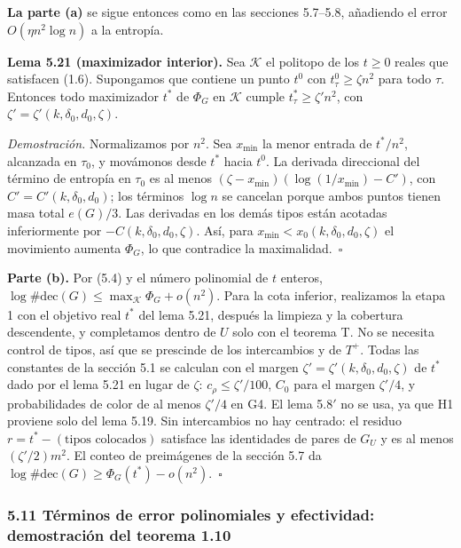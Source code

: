 \documentclass[spanish,11pt,a4paper]{article}
\begin{document}
\textbf{La parte (a)} se sigue entonces como en las secciones 5.7--5.8, añadiendo el error \(O(\eta n^2\log n)\) a la entropía.

\textbf{Lema 5.21 (maximizador interior).} Sea \(\mathcal K\) el politopo de los \(t\ge0\) reales que satisfacen (1.6). Supongamos que contiene un punto \(t^0\) con \(t^0_\tau\ge\zeta n^2\) para todo \(\tau\). Entonces todo maximizador \(t^*\) de \(\Phi_G\) en \(\mathcal K\) cumple \(t^*_\tau\ge\zeta'n^2\), con \(\zeta'=\zeta'(k,\delta_0,d_0,\zeta)\).

\emph{Demostración.} Normalizamos por \(n^2\). Sea \(x_{\min}\) la menor entrada de \(t^*/n^2\), alcanzada en \(\tau_0\), y movámonos desde \(t^*\) hacia \(t^0\). La derivada direccional del término de entropía en \(\tau_0\) es al menos \((\zeta-x_{\min})(\log(1/x_{\min})-C')\), con \(C'=C'(k,\delta_0,d_0)\); los términos \(\log n\) se cancelan porque ambos puntos tienen masa total \(e(G)/3\). Las derivadas en los demás tipos están acotadas inferiormente por \(-C(k,\delta_0,d_0,\zeta)\). Así, para \(x_{\min}<x_0(k,\delta_0,d_0,\zeta)\) el movimiento aumenta \(\Phi_G\), lo que contradice la maximalidad.~\(\square\)

\textbf{Parte (b).} Por (5.4) y el número polinomial de \(t\) enteros, \(\log\#\mathrm{dec}(G)\le\max_{\mathcal K}\Phi_G+o(n^2)\). Para la cota inferior, realizamos la etapa 1 con el objetivo real \(t^*\) del lema 5.21, después la limpieza y la cobertura descendente, y completamos dentro de \(U\) solo con el teorema T. No se necesita control de tipos, así que se prescinde de los intercambios y de \(T^+\). Todas las constantes de la sección 5.1 se calculan con el margen \(\zeta'=\zeta'(k,\delta_0,d_0,\zeta)\) de \(t^*\) dado por el lema 5.21 en lugar de \(\zeta\): \(c_\rho\le\zeta'/100\), \(C_0\) para el margen \(\zeta'/4\), y probabilidades de color de al menos \(\zeta'/4\) en G4. El lema 5.8\('\) no se usa, ya que H1 proviene solo del lema 5.19. Sin intercambios no hay centrado: el residuo \(r=t^*-(\text{tipos colocados})\) satisface las identidades de pares de \(G_U\) y es al menos \((\zeta'/2)m^2\). El conteo de preimágenes de la sección 5.7 da \(\log\#\mathrm{dec}(G)\ge\Phi_G(t^*)-o(n^2)\).~\(\square\)

\subsubsection{5.11 Términos de error polinomiales y efectividad: demostración del teorema 1.10}\label{tuxe9rminos-de-error-polinomiales-y-efectividad-demostraciuxf3n-del-teorema-1.10}
\end{document}
